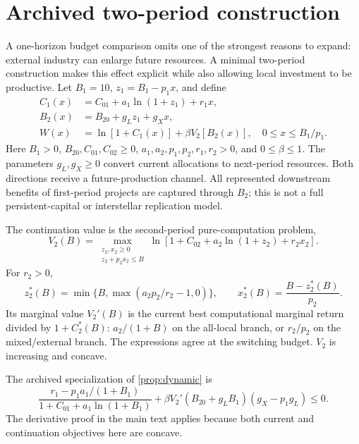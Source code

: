 \documentclass[11pt,a4paper]{article}
\theoremstyle{definition}\newtheorem{definition}{Definition}
\begin{document}
\section{Archived two-period construction}
\label{supp:dynamic}

A one-horizon budget comparison omits one of the strongest reasons to expand: external industry can enlarge future resources. A minimal two-period construction makes this effect explicit while also allowing local investment to be productive. Let $B_1=10$, $z_1=B_1-p_1x$, and define
\begin{align}
 C_1(x)&=C_{01}+a_1\ln(1+z_1)+r_1x,\nonumber\\
 B_2(x)&=B_{20}+g_Lz_1+g_Xx,\label{eq:futurebudget}\\
 W(x)&=\ln[1+C_1(x)]+\beta V_2[B_2(x)],\quad 0\leq x\leq B_1/p_1.
 \label{eq:dynamic}
\end{align}
Here $B_1>0$, $B_{20},C_{01},C_{02}\geq0$, $a_1,a_2,p_1,p_2,r_1,r_2>0$, and $0\leq\beta\leq1$. The parameters $g_L,g_X\geq0$ convert current allocations to next-period resources. Both directions receive a future-production channel. All represented downstream benefits of first-period projects are captured through $B_2$; this is not a full persistent-capital or interstellar replication model.

The continuation value is the second-period pure-computation problem,
\begin{equation}
 V_2(B)=\max_{\substack{z_2,x_2\geq0\\z_2+p_2x_2\leq B}}\ln[1+C_{02}+a_2\ln(1+z_2)+r_2x_2].
 \label{eq:continuation}
\end{equation}
For $r_2>0$,
\begin{equation}
 z_2^*(B)=\min\{B,\max(a_2p_2/r_2-1,0)\},\qquad
 x_2^*(B)=\frac{B-z_2^*(B)}{p_2}.
 \label{eq:stage2}
\end{equation}
Its marginal value $V_2'(B)$ is the current best computational marginal return divided by $1+C_2^*(B)$: $a_2/(1+B)$ on the all-local branch, or $r_2/p_2$ on the mixed/external branch. The expressions agree at the switching budget. $V_2$ is increasing and concave.

The archived specialization of \cref{prop:dynamic} is
\begin{equation}
 \frac{r_1-p_1a_1/(1+B_1)}{1+C_{01}+a_1\ln(1+B_1)}
 +\beta V_2'(B_{20}+g_LB_1)(g_X-p_1g_L)\leq0.
 \label{eq:dynamiccriterion}
\end{equation}
The derivative proof in the main text applies because both current and
continuation objectives here are concave.
\end{document}
